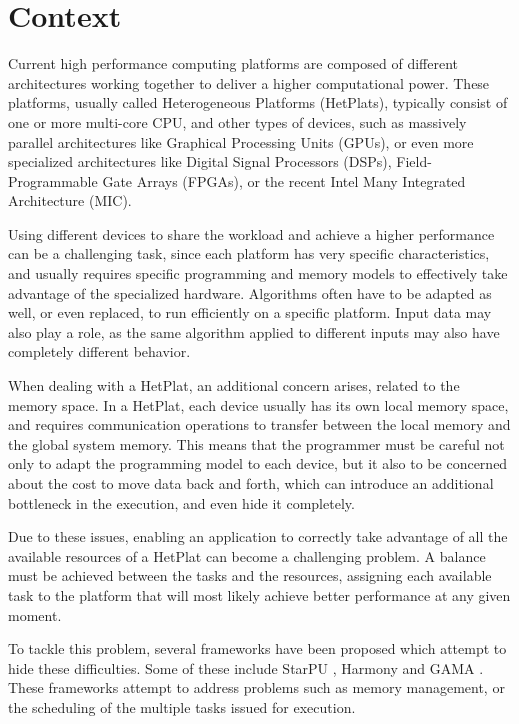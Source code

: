 \section{Context}

Current high performance computing platforms are composed of different architectures working together to deliver a higher computational power. These platforms, usually called Heterogeneous Platforms (HetPlats), typically consist of one or more multi-core CPU, and other types of devices, such as massively parallel architectures like Graphical Processing Units (GPUs), or even more specialized architectures like Digital Signal Processors (DSPs), Field-Programmable Gate Arrays (FPGAs), or the recent Intel Many Integrated Architecture (MIC).

Using different devices to share the workload and achieve a higher performance can be a challenging task, since each platform has very specific characteristics, and usually requires specific programming and memory models to effectively take advantage of the specialized hardware. Algorithms often have to be adapted as well, or even replaced, to run efficiently on a specific platform. Input data may also play a role, as the same algorithm applied to different inputs may also have completely different behavior.

When dealing with a HetPlat, an additional concern arises, related to the memory space. In a HetPlat, each device usually has its own local memory space, and requires communication operations to transfer between the local memory and the global system memory. This means that the programmer must be careful not only to adapt the programming model to each device, but it also to be concerned about the cost to move data back and forth, which can introduce an additional bottleneck in the execution, and even hide it completely.

Due to these issues, enabling an application to correctly take advantage of all the available resources of a HetPlat can become a challenging problem. A balance must be achieved between the tasks and the resources, assigning each available task to the platform that will most likely achieve better performance at any given moment.

To tackle this problem, several frameworks have been proposed which  attempt to hide these difficulties. Some of these include StarPU \cite{augonnet2011starpu}, Harmony \cite{diamos2008harmony} and GAMA \cite{joao2012gama}. These frameworks attempt to address problems such as memory management, or the scheduling of the multiple tasks issued for execution.

